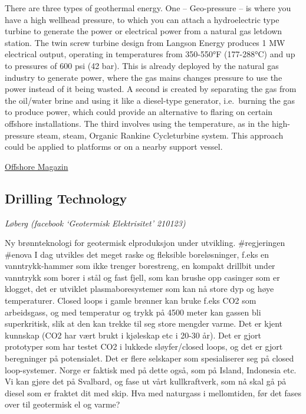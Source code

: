 \documentclass[
]{book}
\begin{document}
There are three types of geothermal energy. One -- Geo-pressure -- is where you have a high wellhead pressure, to which you can attach a hydroelectric type turbine to generate the power or electrical power from a natural gas letdown station. The twin screw turbine design from Langson Energy produces 1 MW electrical output, operating in temperatures from 350-550°F (177-288°C) and up to pressures of 600 psi (42 bar). This is already deployed by the natural gas industry to generate power, where the gas mains changes pressure to use the power instead of it being wasted. A second is created by separating the gas from the oil/water brine and using it like a diesel-type generator, i.e.~burning the gas to produce power, which could provide an alternative to flaring on certain offshore installations. The third involves using the temperature, as in the high-pressure steam, steam, Organic Rankine Cycleturbine system. This approach could be applied to platforms or on a nearby support vessel.

\href{https://www.offshore-mag.com/pipelines/article/16762144/geothermal-power-an-alternate-role-for-redundant-north-sea-platforms}{Offshore Magazin}

\hypertarget{drilling-technology}{%
\subsection{Drilling Technology}\label{drilling-technology}}

\emph{Løberg (facebook `Geotermisk Elektrisitet' 210123)}

Ny brønnteknologi for geotermisk elproduksjon under utvikling. \#regjeringen \#enova I dag utvikles det meget raske og fleksible boreløsninger, f.eks en vanntrykk-hammer som ikke trenger borestreng, en kompakt drillbit under vanntrykk som borer i stål og fast fjell, som kan brushe opp casinger som er klogget, det er utviklet plasmaboresystemer som kan nå store dyp og høye temperaturer. Closed loops i gamle brønner kan bruke f.eks CO2 som arbeidsgass, og med temperatur og trykk på 4500 meter kan gassen bli superkritisk, slik at den kan trekke til seg store mengder varme. Det er kjent kunnskap (CO2 har vært brukt i kjøleskap etc i 20-30 år). Det er gjort prototyper som har testet CO2 i lukkede sløyfer/closed loops, og det er gjort beregninger på potensialet. Det er flere selskaper som spesialiserer seg på closed loop-systemer. Norge er faktisk med på dette også, som på Island, Indonesia etc. Vi kan gjøre det på Svalbard, og fase ut vårt kullkraftverk, som nå skal gå på diesel som er fraktet dit med skip. Hva med naturgass i mellomtiden, før det fases over til geotermisk el og varme?
\end{document}
